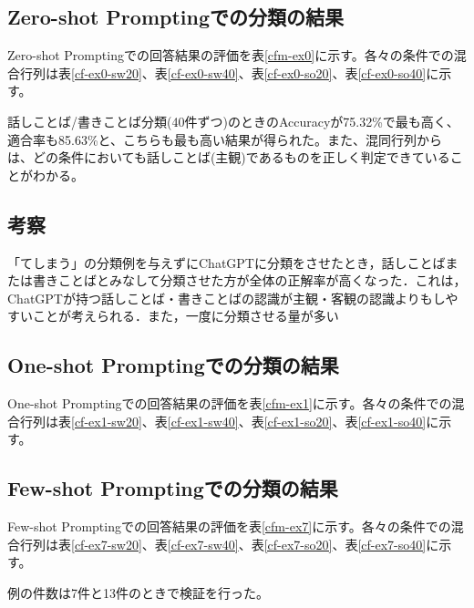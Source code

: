 \subsection{Zero-shot Promptingでの分類の結果}
Zero-shot Promptingでの回答結果の評価を表\ref{cfm-ex0}に示す。各々の条件での混合行列は表\ref{cf-ex0-sw20}、表\ref{cf-ex0-sw40}、表\ref{cf-ex0-so20}、表\ref{cf-ex0-so40}に示す。






話しことば/書きことば分類(40件ずつ)のときのAccuracyが75.32\%で最も高く、適合率も85.63\%と、こちらも最も高い結果が得られた。また、混同行列からは、どの条件においても話しことば(主観)であるものを正しく判定できていることがわかる。

\subsection{考察}
「てしまう」の分類例を与えずにChatGPTに分類をさせたとき，話しことばまたは書きことばとみなして分類させた方が全体の正解率が高くなった．これは，ChatGPTが持つ話しことば・書きことばの認識が主観・客観の認識よりもしやすいことが考えられる．また，一度に分類させる量が多い

\subsection{One-shot Promptingでの分類の結果}
One-shot Promptingでの回答結果の評価を表\ref{cfm-ex1}に示す。各々の条件での混合行列は表\ref{cf-ex1-sw20}、表\ref{cf-ex1-sw40}、表\ref{cf-ex1-so20}、表\ref{cf-ex1-so40}に示す。







\subsection{Few-shot Promptingでの分類の結果}
Few-shot Promptingでの回答結果の評価を表\ref{cfm-ex7}に示す。各々の条件での混合行列は表\ref{cf-ex7-sw20}、表\ref{cf-ex7-sw40}、表\ref{cf-ex7-so20}、表\ref{cf-ex7-so40}に示す。

例の件数は7件と13件のときで検証を行った。





